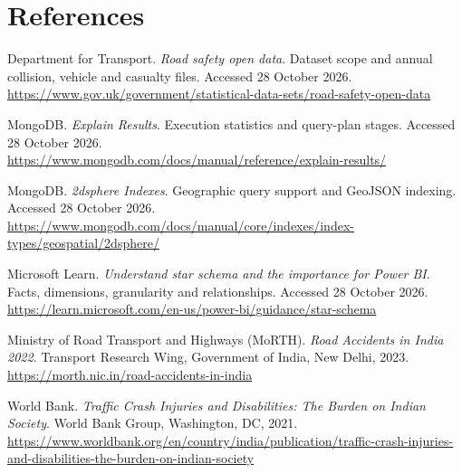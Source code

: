 \documentclass[11pt,a4paper]{article}
\begin{document}
\clearpage
\section*{References}
\begin{enumerate}[label={[\arabic*]},itemsep=10pt]
\item Department for Transport. \emph{Road safety open data}. Dataset scope and annual collision, vehicle and casualty files. Accessed 28 October 2026.\\
\url{https://www.gov.uk/government/statistical-data-sets/road-safety-open-data}
\item MongoDB. \emph{Explain Results}. Execution statistics and query-plan stages. Accessed 28 October 2026.\\
\url{https://www.mongodb.com/docs/manual/reference/explain-results/}
\item MongoDB. \emph{2dsphere Indexes}. Geographic query support and GeoJSON indexing. Accessed 28 October 2026.\\
\url{https://www.mongodb.com/docs/manual/core/indexes/index-types/geospatial/2dsphere/}
\item Microsoft Learn. \emph{Understand star schema and the importance for Power BI}. Facts, dimensions, granularity and relationships. Accessed 28 October 2026.\\
\url{https://learn.microsoft.com/en-us/power-bi/guidance/star-schema}
\item Ministry of Road Transport and Highways (MoRTH). \emph{Road Accidents in India 2022}. Transport Research Wing, Government of India, New Delhi, 2023.\\
\url{https://morth.nic.in/road-accidents-in-india}
\item World Bank. \emph{Traffic Crash Injuries and Disabilities: The Burden on Indian Society}. World Bank Group, Washington, DC, 2021.\\
\url{https://www.worldbank.org/en/country/india/publication/traffic-crash-injuries-and-disabilities-the-burden-on-indian-society}
\end{enumerate}
\end{document}
